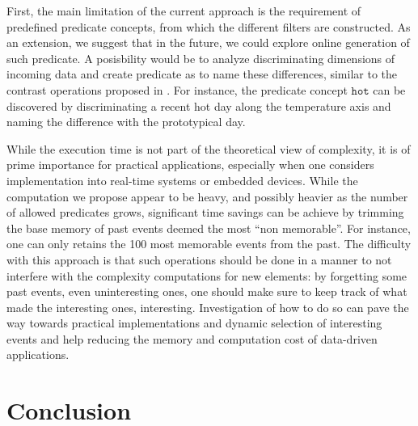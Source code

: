 \documentclass[conference]{IEEEtran}
\begin{document}
First, the main limitation of the current approach is the requirement of
predefined predicate concepts, from which the different filters are constructed.
As an extension, we suggest that in the future, we could explore online
generation of such predicate. A posisbility would be to analyze discriminating
dimensions of incoming data and create predicate as to name these differences,
similar to the contrast operations proposed in \cite{dessalles_conceptual_2015,
  gardenfors2004conceptual}. For instance, the predicate concept $\mathtt{hot}$
can be discovered by discriminating a recent hot day along the
temperature axis and naming the difference with the prototypical day.

While the execution time is not part of the theoretical view of complexity, it
is of prime importance for practical applications, especially when one considers
implementation into real-time systems or embedded devices. While the computation
we propose appear to be heavy, and possibly heavier as the number of allowed
predicates grows, significant time savings can be achieve by trimming the base
memory of past events deemed the most ``non memorable''. For instance, one can
only retains the 100 most memorable events from the past. The difficulty with
this approach is that such operations should be done in a manner to not
interfere with the complexity computations for new elements: by forgetting some
past events, even uninteresting ones, one should make sure to keep track of what
made the interesting ones, interesting. Investigation of how to do so can pave
the way towards practical implementations and dynamic selection of interesting
events and help reducing the memory and computation cost of data-driven applications.


\section{Conclusion}




\end{document}
